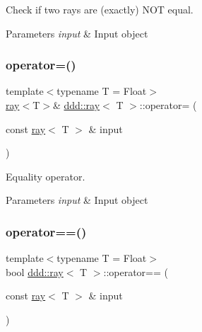 Check if two rays are (exactly) N\+OT equal. 


\begin{DoxyParams}{Parameters}
{\em input} & Input object \\
\hline
\end{DoxyParams}
\mbox{\label{classddd_1_1ray_a5d035573694570d6a80a76b489ecd9fd}} 
\subsubsection{\texorpdfstring{operator=()}{operator=()}}
{\footnotesize\ttfamily template$<$typename T = Float$>$ \\
\hyperlink{classddd_1_1ray}{ray}$<$T$>$\& \hyperlink{classddd_1_1ray}{ddd\+::ray}$<$ T $>$\+::operator= (\begin{DoxyParamCaption}\item[{const \hyperlink{classddd_1_1ray}{ray}$<$ T $>$ \&}]{input }\end{DoxyParamCaption})\hspace{0.3cm}{\ttfamily [inline]}}



Equality operator. 


\begin{DoxyParams}{Parameters}
{\em input} & Input object \\
\hline
\end{DoxyParams}
\mbox{\label{classddd_1_1ray_ac2a7a6189983df2aafa917b3a673eb49}} 
\subsubsection{\texorpdfstring{operator==()}{operator==()}}
{\footnotesize\ttfamily template$<$typename T = Float$>$ \\
bool \hyperlink{classddd_1_1ray}{ddd\+::ray}$<$ T $>$\+::operator== (\begin{DoxyParamCaption}\item[{const \hyperlink{classddd_1_1ray}{ray}$<$ T $>$ \&}]{input }\end{DoxyParamCaption})\hspace{0.3cm}{\ttfamily [inline]}}



